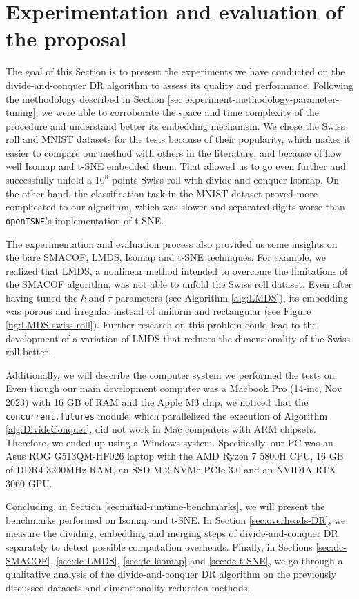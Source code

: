 \section{Experimentation and evaluation of the proposal}
\label{sec:experimentation-and-evaluation}

The goal of this Section is to present the experiments we have conducted on the divide-and-conquer DR algorithm to assess its quality and performance. Following the methodology described in Section \ref{sec:experiment-methodology-parameter-tuning}, we were able to corroborate the space and time complexity of the procedure and understand better its embedding mechanism. We chose the Swiss roll and MNIST datasets for the tests because of their popularity, which makes it easier to compare our method with others in the literature, and because of how well Isomap and t-SNE embedded them. That allowed us to go even further and successfully unfold a $10^8$ points Swiss roll with divide-and-conquer Isomap. On the other hand, the classification task in the MNIST dataset proved more complicated to our algorithm, which was slower and separated digits worse than \verb|openTSNE|'s implementation of t-SNE.

The experimentation and evaluation process also provided us some insights on the bare SMACOF, LMDS, Isomap and t-SNE techniques. For example, we realized that LMDS, a nonlinear method intended to overcome the limitations of the SMACOF algorithm, was not able to unfold the Swiss roll dataset. Even after having tuned the $k$ and $\tau$ parameters (see Algorithm \ref{alg:LMDS}), its embedding was porous and irregular instead of uniform and rectangular (see Figure \ref{fig:LMDS-swiss-roll}). Further research on this problem could lead to the development of a variation of LMDS that reduces the dimensionality of the Swiss roll better.

Additionally, we will describe the computer system we performed the tests on. Even though our main development computer was a  Macbook Pro (14-inc, Nov 2023) with 16 GB of RAM and the Apple M3 chip, we noticed that the \verb|concurrent.futures| module, which parallelized the execution of Algorithm \ref{alg:DivideConquer}, did not work in Mac computers with ARM chipsets. Therefore, we ended up using a Windows system. Specifically, our PC was an Asus ROG G513QM-HF026 laptop with the AMD Ryzen 7 5800H CPU, 16 GB of DDR4-3200MHz RAM, an SSD M.2 NVMe PCIe 3.0 and an NVIDIA RTX 3060 GPU.

Concluding, in Section \ref{sec:initial-runtime-benchmarks}, we will present the benchmarks performed on Isomap and t-SNE. In Section \ref{sec:overheads-DR}, we measure the dividing, embedding and merging steps of divide-and-conquer DR separately to detect possible computation overheads. Finally, in Sections \ref{sec:dc-SMACOF}, \ref{sec:dc-LMDS}, \ref{sec:dc-Isomap} and \ref{sec:dc-t-SNE}, we go through a qualitative analysis of the divide-and-conquer DR algorithm on the previously discussed datasets and dimensionality-reduction methods.



